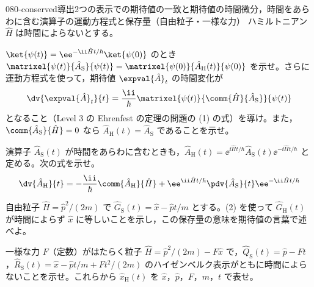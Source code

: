 \documentclass[uplatex,dvipdfmx,a4paper,11pt]{jsarticle}
\begin{document}
\begin{mondai}{080-conserved}{導出}{2つの表示での期待値の一致と期待値の時間微分，時間をあらわに含む演算子の運動方程式と保存量（自由粒子・一様な力）}
ハミルトニアン $\hat{H}$ は時間によらないとする。
  \begin{shoumon}
    \item $\ket{\psi(t)}=\ee^{-\ii\hat{H}t/\hbar}\ket{\psi(0)}$ のとき $\matrixel{\psi(t)}{\hat{A}_{\mathrm{S}}}{\psi(t)}=\matrixel{\psi(0)}{\hat{A}_{\mathrm{H}}(t)}{\psi(0)}$ を示せ。さらに運動方程式を使って，期待値 $\expval{\hat{A}}_{t}$ の時間変化が
    \[ \dv{\expval{\hat{A}}_{t}}{t}=\frac{\ii}{\hbar}\matrixel{\psi(t)}{\comm{\hat{H}}{\hat{A}_{\mathrm{S}}}}{\psi(t)} \]
    となること（Level 3 の Ehrenfest の定理の問題の (1) の式）を導け。また，$\comm{\hat{A}_{\mathrm{S}}}{\hat{H}}=0$ なら $\hat{A}_{\mathrm{H}}(t)=\hat{A}_{\mathrm{S}}$ であることを示せ。
    \item 演算子 $\hat{A}_{\mathrm{S}}(t)$ が時間をあらわに含むときも，$\hat{A}_{\mathrm{H}}(t)=\ee^{\ii\hat{H}t/\hbar}\hat{A}_{\mathrm{S}}(t)\ee^{-\ii\hat{H}t/\hbar}$ と定める。次の式を示せ。
    \[ \dv{\hat{A}_{\mathrm{H}}}{t}=-\frac{\ii}{\hbar}\comm{\hat{A}_{\mathrm{H}}}{\hat{H}}+\ee^{\ii\hat{H}t/\hbar}\pdv{\hat{A}_{\mathrm{S}}}{t}\ee^{-\ii\hat{H}t/\hbar} \]
    \item 自由粒子 $\hat{H}=\hat{p}^{2}/(2m)$ で $\hat{G}_{\mathrm{S}}(t)=\hat{x}-\hat{p}t/m$ とする。(2) を使って $\hat{G}_{\mathrm{H}}(t)$ が時間によらず $\hat{x}$ に等しいことを示し，この保存量の意味を期待値の言葉で述べよ。
    \item 一様な力 $F$（定数）がはたらく粒子 $\hat{H}=\hat{p}^{2}/(2m)-F\hat{x}$ で，$\hat{Q}_{\mathrm{S}}(t)=\hat{p}-Ft$，$\hat{R}_{\mathrm{S}}(t)=\hat{x}-\hat{p}t/m+Ft^{2}/(2m)$ のハイゼンベルク表示がともに時間によらないことを示せ。これらから $\hat{x}_{\mathrm{H}}(t)$ を $\hat{x}$，$\hat{p}$，$F$，$m$，$t$ で表せ。
  \end{shoumon}


\end{mondai}
\end{document}
